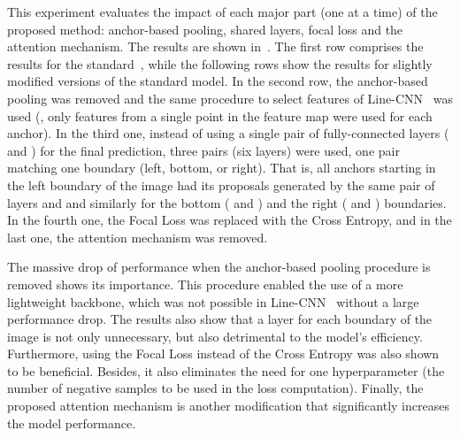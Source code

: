 \documentclass[final]{cvpr}
\begin{document}
	
This experiment evaluates the impact of each major part (one at a time) of the proposed method: anchor-based pooling, shared layers, focal loss and the attention mechanism.
The results are shown in~. The first row comprises the results for the standard~\methodname, while the following rows show the results for slightly modified versions of the standard model.
In the second row, the anchor-based pooling was removed and the same procedure to select features of Line-CNN~\cite{linecnn} was used (\ie, only features from a single point in the feature map were used for each anchor). In the third one, instead of using a single pair of fully-connected layers ( and ) for the final prediction, three pairs (six layers) were used, one pair matching one boundary (left, bottom, or right). That is, all anchors starting in the left boundary of the image had its proposals generated by the same pair of layers  and  and similarly for the bottom ( and ) and the right ( and ) boundaries. In the fourth one, the Focal Loss was replaced with the Cross Entropy, and in the last one, the attention mechanism was removed.

The massive drop of performance when the anchor-based pooling procedure is removed shows its importance. This procedure enabled the use of a more lightweight backbone, which was not possible in Line-CNN~\cite{linecnn} without a large performance drop. The results also show that a layer for each boundary of the image is not only unnecessary, but also detrimental to the model's efficiency. Furthermore, using the Focal Loss instead of the Cross Entropy was also shown to be beneficial. Besides, it also eliminates the need for one hyperparameter (the number of negative samples to be used in the loss computation).
Finally, the proposed attention mechanism is another modification that significantly increases the model performance.
\end{document}
